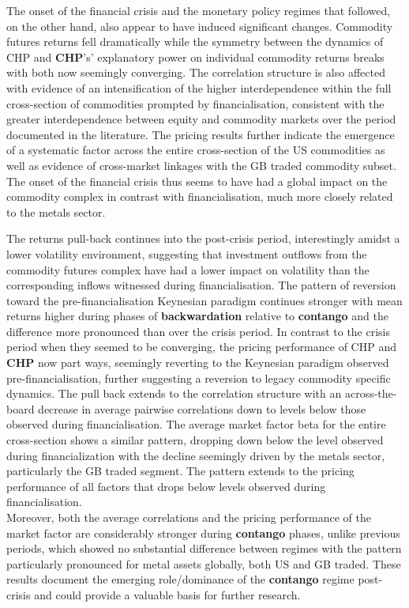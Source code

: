\documentclass[
  authoryear,
  preprint,
  3p]{elsarticle}
\begin{document}
\bigskip

The onset of the financial crisis and the monetary policy regimes that
followed, on the other hand, also appear to have induced significant
changes. Commodity futures returns fell dramatically while the symmetry
between the dynamics of CHP and \textbf{CHP}'s' explanatory power on
individual commodity returns breaks with both now seemingly converging.
The correlation structure is also affected with evidence of an
intensification of the higher interdependence within the full
cross-section of commodities prompted by financialisation, consistent
with the greater interdependence between equity and commodity markets
over the period documented in the literature. The pricing results
further indicate the emergence of a systematic factor across the entire
cross-section of the US commodities as well as evidence of cross-market
linkages with the GB traded commodity subset. The onset of the financial
crisis thus seems to have had a global impact on the commodity complex
in contrast with financialisation, much more closely related to the
metals sector.

\medskip

The returns pull-back continues into the post-crisis period,
interestingly amidst a lower volatility environment, suggesting that
investment outflows from the commodity futures complex have had a lower
impact on volatility than the corresponding inflows witnessed during
financialisation. The pattern of reversion toward the
pre-financialisation Keynesian paradigm continues stronger with mean
returns higher during phases of \textbf{backwardation} relative to
\textbf{contango} and the difference more pronounced than over the
crisis period. In contrast to the crisis period when they seemed to be
converging, the pricing performance of CHP and \textbf{CHP} now part
ways, seemingly reverting to the Keynesian paradigm observed
pre-financialisation, further suggesting a reversion to legacy commodity
specific dynamics. The pull back extends to the correlation structure
with an across-the-board decrease in average pairwise correlations down
to levels below those observed during financialisation. The average
market factor beta for the entire cross-section shows a similar pattern,
dropping down below the level observed during financialization with the
decline seemingly driven by the metals sector, particularly the GB
traded segment. The pattern extends to the pricing performance of all
factors that drops below levels observed during financialisation.\\
Moreover, both the average correlations and the pricing performance of
the market factor are considerably stronger during \textbf{contango}
phases, unlike previous periods, which showed no substantial difference
between regimes with the pattern particularly pronounced for metal
assets globally, both US and GB traded. These results document the
emerging role/dominance of the \textbf{contango} regime post-crisis and
could provide a valuable basis for further research.
\end{document}
